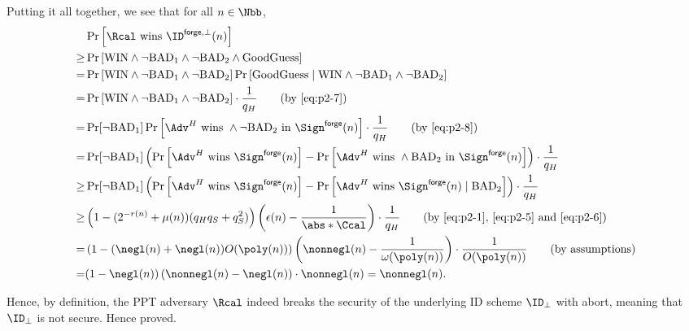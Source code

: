 \begin{answer}
    Putting it all together, we see that for all $n\in\Nbb$,
    \begin{align*}
        &\Pr\left[\Rcal \textrm{ wins } \ID^{\mathsf{forge},\bot}(n)\right]\\
        \ge& \Pr\left[\textrm{WIN} \land \neg \textrm{BAD}_1\land \neg \textrm{BAD}_2 \land \textrm{GoodGuess} \right]\\
        =& \Pr\left[\textrm{WIN} \land \neg \textrm{BAD}_1\land \neg \textrm{BAD}_2\right] \Pr\left[\textrm{GoodGuess}\mid \textrm{WIN} \land \neg \textrm{BAD}_1\land \neg \textrm{BAD}_2\right]\\
        =& \Pr\left[\textrm{WIN} \land \neg \textrm{BAD}_1\land \neg \textrm{BAD}_2\right] \cdot \frac{1}{q_H}
        \qquad (\textrm{by \eqref{eq:p2-7}})\\
        =& \Pr[\neg \textrm{BAD}_1]\Pr\left[\Adv^H \textrm{ wins } \land \neg \textrm{BAD}_2 \textrm{ in } \Sign^{\mathsf{forge}}(n)  \right] \cdot \frac{1}{q_H}
        \qquad (\textrm{by \eqref{eq:p2-8}})\\
        =& \Pr[\neg \textrm{BAD}_1]\left(\Pr\left[\Adv^H \textrm{ wins }\Sign^{\mathsf{forge}}(n)  \right]-\Pr\left[\Adv^H \textrm{ wins } \land  \textrm{BAD}_2 \textrm{ in } \Sign^{\mathsf{forge}}(n)  \right]\right) \cdot \frac{1}{q_H}\\
        \ge& \Pr[\neg \textrm{BAD}_1]\left(\Pr\left[\Adv^H \textrm{ wins }\Sign^{\mathsf{forge}}(n)  \right]- \Pr\left[\Adv^H \textrm{ wins } \Sign^{\mathsf{forge}}(n) \mid \textrm{BAD}_2  \right]\right) \cdot \frac{1}{q_H}\\
        \ge& \left(1- (2^{-r(n)}+\mu(n))(q_Hq_S+q_S^2)\right)\left(\epsilon(n) - \frac{1}{\abs*{\Ccal}} \right)\cdot \frac{1}{q_H}
        \qquad (\textrm{by \eqref{eq:p2-1}, \eqref{eq:p2-5} and \eqref{eq:p2-6}})\\
        =& \left(1-(\negl(n)+\negl(n))O(\poly(n))\right)\left(\nonnegl(n)-\frac{1}{\omega(\poly(n))} \right)\cdot \frac{1}{O(\poly(n))}
        \qquad (\textrm{by assumptions})\\
        =& (1-\negl(n)) \left(\nonnegl(n)-\negl(n) \right)\cdot \nonnegl(n)
        = \nonnegl(n).
    \end{align*}

    Hence, by definition, the PPT adversary $\Rcal$ indeed breaks the security of the underlying ID scheme $\ID_\bot$ with abort, meaning that $\ID_\bot$ is not secure. Hence proved.
\end{answer}
